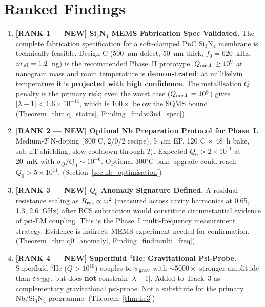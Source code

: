 \documentclass[11pt]{article}
\theoremstyle{definition}
\theoremstyle{remark}
\newcommand{\ee}[1]{\times 10^{#1}}
\newcommand{\psigrav}{\psi_{\rm grav}}
\newcommand{\psiEM}{\delta\psi_{\rm EM}}
\newcommand{\lam}{|\lambda-1|}
\newcommand{\Qmech}{Q_{\rm mech}}
\begin{document}
\section{Ranked Findings}
\label{sec:ranked}

\begin{enumerate}
  \item \textbf{[RANK 1 --- NEW] Si$_3$N$_4$ MEMS Fabrication Spec
    Validated.}
    The complete fabrication specification for a soft-clamped PnC
    Si$_3$N$_4$ membrane is technically feasible. Design C (500~$\mu$m
    defect, 50~nm thick, $f_0 = 620$~kHz, $m_{\rm eff} = 1.2$~ng)
    is the recommended Phase~II prototype. $\Qmech \geq 10^9$ at
    nanogram mass and room temperature is \textbf{demonstrated};
    at millikelvin temperature it is \textbf{projected with high
    confidence}. The metallisation $Q$ penalty is the primary risk;
    even the worst case ($\Qmech = 10^8$) gives $\lam < 1.6\ee{-14}$,
    which is $100\times$ below the SQMS bound.
    (Theorem~\ref{thm:q_status}, Finding~\ref{find:si3n4_spec})

  \item \textbf{[RANK 2 --- NEW] Optimal Nb Preparation Protocol for
    Phase~I.}
    Medium-$T$ N-doping (800$^\circ$C, 2/0/2 recipe), 5~$\mu$m EP,
    120$^\circ$C $\times$ 48~h bake, sub-nT shielding, slow cooldown
    through $T_c$. Expected $Q_0 > 2\ee{11}$ at 20~mK with
    $\sigma_Q/Q_0 \sim 10^{-6}$. Optional 300$^\circ$C bake upgrade
    could reach $Q_0 > 5\ee{11}$.
    (Section~\ref{sec:nb_optimisation})

  \item \textbf{[RANK 3 --- NEW] $Q_0$ Anomaly Signature Defined.}
    A residual resistance scaling as $R_{\rm res} \propto \omega^2$
    (measured across cavity harmonics at 0.65, 1.3, 2.6~GHz) after
    BCS subtraction would constitute circumstantial evidence of
    psi-EM coupling. This is the Phase~I multi-frequency measurement
    strategy. Evidence is indirect; MEMS experiment needed for
    confirmation.
    (Theorem~\ref{thm:q0_anomaly}, Finding~\ref{find:multi_freq})

  \item \textbf{[RANK 4 --- NEW] Superfluid $^3$He: Gravitational
    Psi-Probe.}
    Superfluid $^3$He ($Q > 10^{10}$) couples to $\psigrav$ with
    $\sim 5000\times$ stronger amplitude than $\psiEM$, but does
    \textbf{not} constrain $|\lambda-1|$. Added to Track~3 as
    complementary gravitational psi-probe. Not a substitute for
    the primary Nb/Si$_3$N$_4$ programme.
    (Theorem~\ref{thm:he3})


\end{enumerate}
\end{document}
